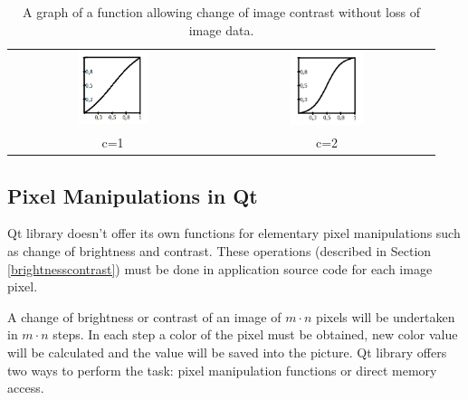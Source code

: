 \begin{table}[ht]
\captionsetup{tablename=Figures}
\centering
\caption{A graph of a function allowing change of image contrast without loss of image data.\label{myfunction}}
	\begin{tabular}{cc}
		\includegraphics[width=0.35\textwidth]{Text/IMG/nelinearni1.jpg} & \includegraphics[width=0.35\textwidth]{Text/IMG/nelinearni2.jpg} \\
		c=1 & c=2\\
	\end{tabular}
\end{table}

\subsection{Pixel Manipulations in Qt}

Qt library doesn't offer its own functions for elementary pixel manipulations such as change of brightness and contrast. These operations (described in Section \ref{brightnesscontrast}) must be done in application source code for each image pixel.

A change of brightness or contrast of an image of $m \cdot n$ pixels will be undertaken in $m \cdot n$ steps. In each step a color of the pixel must be obtained, new color value will be calculated and the value will be saved into the picture. Qt library offers two ways to perform the task: pixel manipulation functions or direct memory access.

